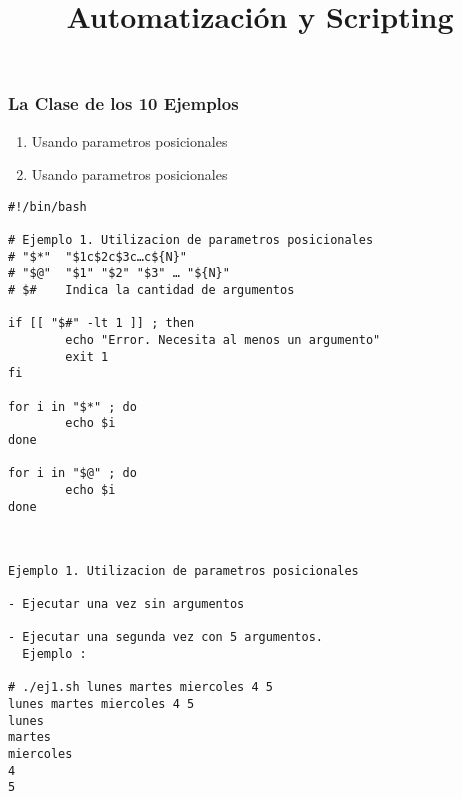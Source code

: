 \documentclass{beamer}
\title{Automatización y Scripting}
\begin{document}
\begin{frame}
  \titlepage

\end{frame}






\begin{frame}{}
\frametitle{La Clase de los 10 Ejemplos}
\begin{enumerate}
\item Usando parametros posicionales
\item Usando parametros posicionales
\end{enumerate}
\end{frame}{}



\begin{Verbatim}
#!/bin/bash

# Ejemplo 1. Utilizacion de parametros posicionales
# "$*"  "$1c$2c$3c…c${N}"
# "$@"  "$1" "$2" "$3" … "${N}"
# $#    Indica la cantidad de argumentos

if [[ "$#" -lt 1 ]] ; then
        echo "Error. Necesita al menos un argumento"
        exit 1
fi

for i in "$*" ; do
        echo $i
done

for i in "$@" ; do
        echo $i
done
\end{Verbatim}


\begin{Verbatim}


Ejemplo 1. Utilizacion de parametros posicionales

- Ejecutar una vez sin argumentos

- Ejecutar una segunda vez con 5 argumentos.
  Ejemplo : 

# ./ej1.sh lunes martes miercoles 4 5
lunes martes miercoles 4 5
lunes
martes
miercoles
4
5

\end{Verbatim}
\end{document}
